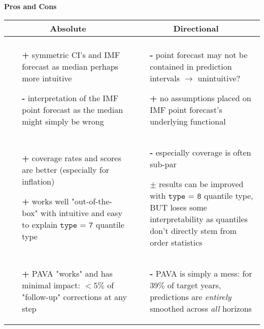 \documentclass{article}
\begin{document}
\noindent
\Large{\textbf{Pros and Cons}}\bigskip
\normalsize
\begin{center}
\begin{tabular}{ p{0.5\linewidth} |p{0.5\linewidth} } 
\multicolumn{1}{c|}{\textbf{Absolute} }& \multicolumn{1}{c}{\textbf{Directional} }\\ \hline \\[-0.8em]
\begin{itemize}
\item[\textbf{+}] symmetric CI's and IMF forecast as median perhaps more intuitive
\item[\textbf{-}] interpretation of the IMF point forecast as the median might simply be wrong
\end{itemize} & 
\begin{itemize}
\item[\textbf{-}]point forecast may not be contained in prediction intervals $\rightarrow$ unintuitive?
\item[\textbf{+}] no assumptions placed on IMF point forecast's underlying functional
\end{itemize} \\ 

\begin{itemize}
\item[\textbf{+}] coverage rates and scores are better (especially for inflation)
\item[\textbf{+}] works well "out-of-the-box" with intuitive and easy to explain $\texttt{type = 7}$ quantile type
\end{itemize} & 
\begin{itemize}
\item[\textbf{-}]especially coverage is often sub-par
\item[$\pm$] results can be improved with $\texttt{type = 8}$ quantile type, BUT loses some interpretability as quantiles don't directly stem from order statistics
\end{itemize} \\ 

\begin{itemize}
\item[\textbf{+}] PAVA "works" and has minimal impact: $<5\%$ of "follow-up" corrections at any step
\end{itemize} & 
\begin{itemize}
\item[\textbf{-}] PAVA is simply a mess: for $39\% $ of target years, predictions are \textit{entirely} smoothed across \textit{all} horizons
\end{itemize} \\ 


\end{tabular}
\end{center}
\end{document}
